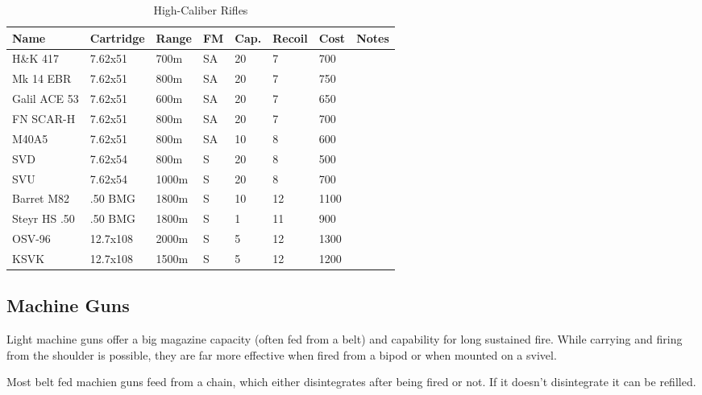 \begin{table}
  \caption{High-Caliber Rifles}
  \begin{center}
    \begin{tabular}{| l | l | l | l | l | l | l | l |}
      \hline
      \textbf{Name} & \textbf{Cartridge} & \textbf{Range} &
      \textbf{FM} & \textbf{Cap.} & \textbf{Recoil} &
      \textbf{Cost} & \textbf{Notes} \\ \hline


      H\&K 417      & 7.62x51  &  700m & SA & 20 & 7  &  700 & \\ \hline
      Mk 14 EBR     & 7.62x51  &  800m & SA & 20 & 7  &  750 & \\ \hline
      Galil ACE 53  & 7.62x51  &  600m & SA & 20 & 7  &  650 & \\ \hline
      FN SCAR-H     & 7.62x51  &  800m & SA & 20 & 7  &  700 & \\ \hline
      M40A5         & 7.62x51  &  800m & SA & 10 & 8  &  600 & \\ \hline

      SVD           & 7.62x54  &  800m & S  & 20 & 8  &  500 & \\ \hline
      SVU           & 7.62x54  & 1000m & S  & 20 & 8  &  700 & \\ \hline

      Barret M82    & .50 BMG  & 1800m & S  & 10 & 12 & 1100 & \\ \hline
      Steyr HS .50  & .50 BMG  & 1800m & S  &  1 & 11 &  900 & \\ \hline

      OSV-96        & 12.7x108 & 2000m & S  &  5 & 12 & 1300 & \\ \hline
      KSVK          & 12.7x108 & 1500m & S  &  5 & 12 & 1200 & \\ \hline
    \end{tabular}
  \end{center}
\end{table}


\subsection{Machine Guns}

Light machine guns offer a big magazine capacity (often fed from a belt) and
capability for long sustained fire. While carrying and firing from the shoulder
is possible, they are far more effective when fired from a bipod or when mounted
on a svivel.

Most belt fed machien guns feed from a chain, which either disintegrates after
being fired or not. If it doesn't disintegrate it can be refilled.

